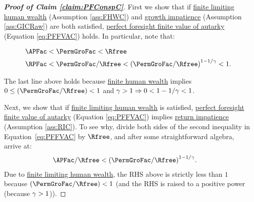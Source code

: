 \documentclass[\econtexRoot/BufferStockTheory]{subfiles}
\begin{document}
\begin{proof}[\textbf{Proof of Claim \ref{claim:PFConspC}}]
First we show that if \hyperlink{FHWC}{finite limiting human wealth} (Assumption \ref{ass:FHWC}) and \hyperlink{GIC}{growth impatience} (Assumption \ref{ass:GICRaw}) are both satisfied, \hyperlink{PFFVAC}{perfect foresight finite value of autarky} (Equation \eqref{eq:PFFVAC}) holds.
In particular, note that:
  
\begin{equation}\label{eq:GICandFHWCimplyPFFVAC}
  \begin{aligned}
    \APFac & < \PermGroFac < \Rfree
    \\   \RPFac & < \PermGroFac/\Rfree < {(\PermGroFac/\Rfree)}^{1-1/\CRRA} < 1.
  \end{aligned}
\end{equation}

The last line above holds because \hyperlink{FHWC}{finite human wealth} implies $0 \leq (\PermGroFac/\Rfree) < 1$ and $\gamma > 1 \Rightarrow 0 < 1-1/\gamma < 1$.


Next, we show that if \hyperlink{FHWC}{finite limiting human wealth} is satisfied, \hyperlink{PFFVAC}{perfect foresight finite value of autarky} (Equation \eqref{eq:PFFVAC}) implies \hyperlink{RIC}{return impatience} (Assumption \ref{ass:RIC}).
To see why, divide both sides of the second inequality in Equation~\eqref{eq:PFFVAC} by $\Rfree$, and after some straightforward algebra, arrive at:
%
  \begin{equation}\begin{gathered}\begin{aligned}
    \APFac/\Rfree & < {(\PermGroFac/\Rfree)}^{1-1/\CRRA}  \label{eq:FHWCandPFFVACimplyRIC}.
  \end{aligned}\end{gathered}\end{equation}
  Due to \hyperlink{FHWC}{finite limiting human wealth}, the RHS above is strictly less than $ 1$ because $(\PermGroFac/\Rfree) < 1$ (and the RHS is raised to a positive power (because $\gamma>1$)).

\end{proof}
%

\end{document}
